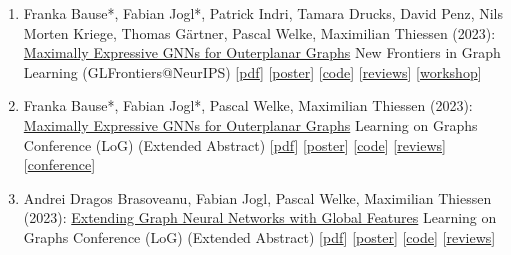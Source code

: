\documentclass{scrartcl}
\begin{document}
\begin{enumerate}
{[\href{https://openreview.net/forum?id=lR5NYB9zrv}{reviews}]
[\href{https://glfrontiers.github.io/}{workshop}]
}
\item
\label{bausejogl2023outerplanarglfrontiers}
Franka Bause*, Fabian Jogl*, Patrick Indri, Tamara Drucks, David Penz, Nils Morten Kriege, Thomas Gärtner, Pascal Welke, Maximilian Thiessen (2023):\newline
\href{https://openreview.net/pdf?id=dn87xnULwF}{Maximally Expressive GNNs for Outerplanar Graphs}\newline
New Frontiers in Graph Learning (GLFrontiers@NeurIPS)\newline
{\footnotesize
[\href{https://pwelke.de/publications/bause2023outerplanarglfroniers.pdf}{pdf}]
[\href{https://pwelke.de/publications/bause2023outerplanar-poster.pdf}{poster}]
[\href{https://github.com/ocatias/outerplanarGNNs/}{code}]
[\href{https://openreview.net/forum?id=gXCqzpvhuD}{reviews}]
[\href{https://glfrontiers.github.io/}{workshop}]
}
\item
\label{bausejogl2023outerplanarlog}
Franka Bause*, Fabian Jogl*, Pascal Welke, Maximilian Thiessen (2023):\newline
\href{https://openreview.net/forum?id=7vyGCFTajk}{Maximally Expressive GNNs for Outerplanar Graphs}\newline
Learning on Graphs Conference (LoG)\newline
(Extended Abstract)\newline
{\footnotesize
[\href{https://pwelke.de/publications/bause2023outerplanarlog.pdf}{pdf}]
[\href{https://pwelke.de/publications/bause2023outerplanar-poster.pdf}{poster}]
[\href{https://github.com/ocatias/OuterplanarGNNs_LoG}{code}]
[\href{https://openreview.net/forum?id=7vyGCFTajk}{reviews}]
[\href{https://logconference.org}{conference}]
}
\item
\label{brasoveanu2023gnnglobalfeatures}
Andrei Dragos Brasoveanu, Fabian Jogl, Pascal Welke, Maximilian Thiessen (2023):\newline
\href{https://openreview.net/forum?id=aisVQy6R2k}{Extending Graph Neural Networks with Global Features}\newline
Learning on Graphs Conference (LoG)\newline
(Extended Abstract)\newline
{\footnotesize
[\href{https://pwelke.de/publications/brasoveanu2023global.pdf}{pdf}]
[\href{https://pwelke.de/publications/brasoveanu2023global-poster.pdf}{poster}]
[\href{https://github.com/andreibrasoveanu97/gnn-global-features}{code}]
[\href{https://openreview.net/forum?id=aisVQy6R2k}{reviews}]
}
\end{enumerate}
\end{document}
